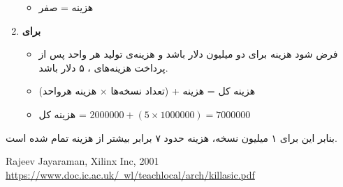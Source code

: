 \begin{qsolve}
\begin{enumerate}
\begin{itemize}
			\item 
			هزینه  = صفر
		
		\end{itemize}
		
		
		\item 
		\textbf{برای }
		\begin{itemize}
			\item 
			فرض شود هزینه  برای  دو میلیون دلار باشد و هزینه‌ی تولید هر واحد  پس از پرداخت هزینه‌های ، ۵ دلار باشد.
			
			\item 
			هزینه کل = هزینه  + (تعداد نسخه‌ها $\times$ هزینه هرواحد)
			
			\item 
			هزینه کل = $2000000 + (5 \times 1000000 ) = 7000000$ 
		\end{itemize}
	\end{enumerate}
	
	بنابر این برای ۱ میلیون نسخه، هزینه  حدود ۷ برابر بیشتر از هزینه تمام شده  است.
\end{qsolve}

 


\begin{latin}
	\begin{thebibliography}{9}
		Rajeev Jayaraman, Xilinx Inc, 2001 \href{https://www.doc.ic.ac.uk/~wl/teachlocal/arch/killasic.pdf}{https://www.doc.ic.ac.uk/~wl/teachlocal/arch/killasic.pdf}
		
	\end{thebibliography} 
\end{latin}